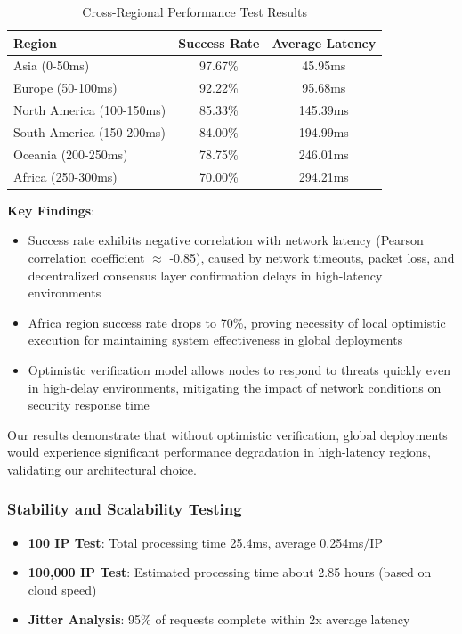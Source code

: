 \documentclass[12pt]{article}
\begin{document}
\begin{table}[H]
\centering
\begin{tabular}{@{}lcc@{}}
\toprule
\textbf{Region} & \textbf{Success Rate} & \textbf{Average Latency} \\
\midrule
Asia (0-50ms) & 97.67\% & 45.95ms \\
Europe (50-100ms) & 92.22\% & 95.68ms \\
North America (100-150ms) & 85.33\% & 145.39ms \\
South America (150-200ms) & 84.00\% & 194.99ms \\
Oceania (200-250ms) & 78.75\% & 246.01ms \\
Africa (250-300ms) & 70.00\% & 294.21ms \\
\bottomrule
\end{tabular}
\caption{Cross-Regional Performance Test Results}
\label{tab:cross_region_performance}
\end{table}

\textbf{Key Findings}:
\begin{itemize}
\item Success rate exhibits negative correlation with network latency (Pearson correlation coefficient $\approx$ -0.85), caused by network timeouts, packet loss, and decentralized consensus layer confirmation delays in high-latency environments
\item Africa region success rate drops to 70\%, proving necessity of local optimistic execution for maintaining system effectiveness in global deployments
\item Optimistic verification model allows nodes to respond to threats quickly even in high-delay environments, mitigating the impact of network conditions on security response time
\end{itemize}

Our results demonstrate that without optimistic verification, global deployments would experience significant performance degradation in high-latency regions, validating our architectural choice.

\subsubsection{Stability and Scalability Testing}
\begin{itemize}
\item \textbf{100 IP Test}: Total processing time 25.4ms, average 0.254ms/IP
\item \textbf{100,000 IP Test}: Estimated processing time about 2.85 hours (based on cloud speed)
\item \textbf{Jitter Analysis}: 95\% of requests complete within 2x average latency
\end{itemize}
\end{document}

